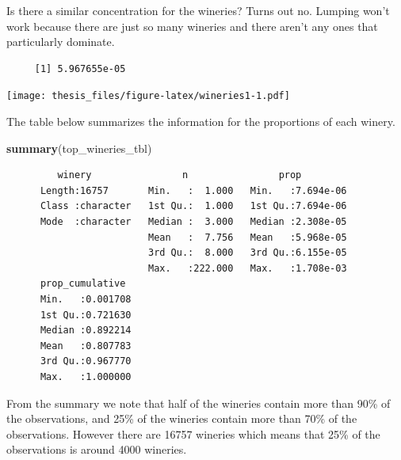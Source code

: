 \documentclass[12pt,twoside]{amherstthesis}
\newenvironment{Shaded}{\begin{snugshade}}{\end{snugshade}}
\newcommand{\KeywordTok}[1]{\textcolor[rgb]{0.13,0.29,0.53}{\textbf{#1}}}
\newcommand{\DataTypeTok}[1]{\textcolor[rgb]{0.13,0.29,0.53}{#1}}
\newcommand{\DecValTok}[1]{\textcolor[rgb]{0.00,0.00,0.81}{#1}}
\newcommand{\StringTok}[1]{\textcolor[rgb]{0.31,0.60,0.02}{#1}}
\newcommand{\OtherTok}[1]{\textcolor[rgb]{0.56,0.35,0.01}{#1}}
\newcommand{\OperatorTok}[1]{\textcolor[rgb]{0.81,0.36,0.00}{\textbf{#1}}}
\newcommand{\NormalTok}[1]{#1}
\begin{document}
Is there a similar concentration for the wineries? Turns out no. Lumping
won't work because there are just so many wineries and there aren't any
ones that particularly dominate.
\begin{Shaded}
\end{Shaded}
\begin{verbatim}
     [1] 5.967655e-05
\end{verbatim}
\begin{Shaded}
\end{Shaded}
\texttt{[image: thesis\_files/figure-latex/wineries1-1.pdf]}

The table below summarizes the information for the proportions of each
winery.
\begin{Shaded}
\begin{Highlighting}[]
\KeywordTok{summary}\NormalTok{(top_wineries_tbl)}
\end{Highlighting}
\end{Shaded}
\begin{verbatim}
         winery                n                prop          
      Length:16757       Min.   :  1.000   Min.   :7.694e-06  
      Class :character   1st Qu.:  1.000   1st Qu.:7.694e-06  
      Mode  :character   Median :  3.000   Median :2.308e-05  
                         Mean   :  7.756   Mean   :5.968e-05  
                         3rd Qu.:  8.000   3rd Qu.:6.155e-05  
                         Max.   :222.000   Max.   :1.708e-03  
      prop_cumulative   
      Min.   :0.001708  
      1st Qu.:0.721630  
      Median :0.892214  
      Mean   :0.807783  
      3rd Qu.:0.967770  
      Max.   :1.000000
\end{verbatim}
From the summary we note that half of the wineries contain more than
90\% of the observations, and 25\% of the wineries contain more than
70\% of the observations. However there are 16757 wineries which means
that 25\% of the observations is around 4000 wineries.
\end{document}
